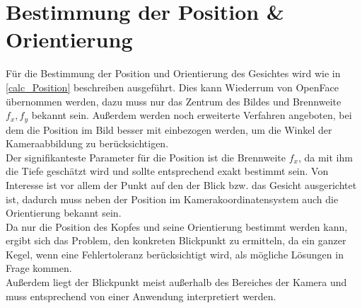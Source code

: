 \section{Bestimmung der Position \& Orientierung}
\label{bestimmung_Pos}
Für die Bestimmung der Position und Orientierung des Gesichtes wird wie in \autoref{calc_Position} beschreiben ausgeführt. Dies kann Wiederrum von OpenFace übernommen werden, dazu muss nur das Zentrum des Bildes und Brennweite $f_x,f_y$ bekannt sein. Außerdem werden noch erweiterte Verfahren angeboten, bei dem die Position im Bild besser mit einbezogen werden, um die Winkel der Kameraabbildung zu berücksichtigen.\\
Der signifikanteste Parameter für die Position ist die Brennweite $f_x$, da mit ihm die Tiefe geschätzt wird und sollte entsprechend exakt bestimmt sein. Von Interesse ist vor allem der Punkt auf den der Blick bzw. das Gesicht ausgerichtet ist, dadurch muss neben der Position im Kamerakoordinatensystem auch die Orientierung bekannt sein.\\
Da nur die Position des Kopfes und seine Orientierung bestimmt werden kann, ergibt sich das Problem, den konkreten Blickpunkt zu ermitteln, da ein ganzer Kegel, wenn eine Fehlertoleranz berücksichtigt wird, als mögliche Lösungen in Frage kommen.\\
Außerdem liegt der Blickpunkt meist außerhalb des Bereiches der Kamera und muss entsprechend von einer Anwendung interpretiert werden.